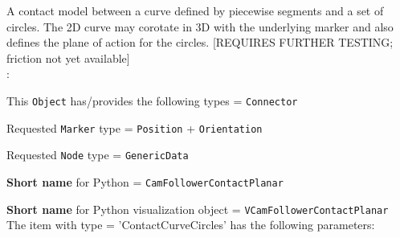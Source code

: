 \ei

%
\newpage


\label{sec:item:ObjectContactCurveCircles}
A contact model between a curve defined by piecewise segments and a set of circles. The 2D curve may corotate in 3D with the underlying marker and also defines the plane of action for the circles. [REQUIRES FURTHER TESTING; friction not yet available]
\vspace{12pt}\\

\noindent {}:
\bi
  \item This \texttt{Object} has/provides the following types = \texttt{Connector}
  \item Requested \texttt{Marker} type = \texttt{Position} + \texttt{Orientation}
  \item Requested \texttt{Node} type = \texttt{GenericData}
  \item {\bf Short name} for Python = \texttt{CamFollowerContactPlanar}
  \item {\bf Short name} for Python visualization object = \texttt{VCamFollowerContactPlanar}
\ei\vspace{12pt} \noindent 
The item  with type = 'ContactCurveCircles' has the following parameters:
\vspace{-0.5cm}\\
\vspace{-0.5cm}\\
